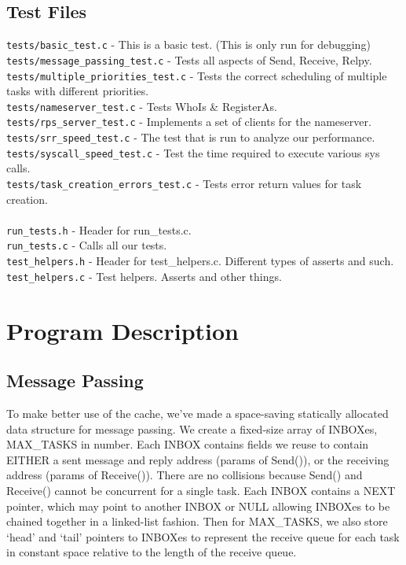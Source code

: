\documentclass[letterpaper]{article}
\begin{document}
\subsection{Test Files}
\verb!tests/basic_test.c! - This is a basic test. (This is only run for debugging)\\
\verb!tests/message_passing_test.c! - Tests all aspects of Send, Receive, Relpy.\\
\verb!tests/multiple_priorities_test.c! - Tests the correct scheduling of multiple tasks with different priorities.\\
\verb!tests/nameserver_test.c! - Tests WhoIs \& RegisterAs.\\
\verb!tests/rps_server_test.c! - Implements a set of clients for the nameserver.\\
\verb!tests/srr_speed_test.c! - The test that is run to analyze our performance.\\
\verb!tests/syscall_speed_test.c! - Test the time required to execute various sys calls.\\
\verb!tests/task_creation_errors_test.c! - Tests error return values for task creation.\\
\\
\verb!run_tests.h! - Header for run\_tests.c.\\
\verb!run_tests.c! - Calls all our tests.\\
\verb!test_helpers.h! - Header for test\_helpers.c. Different types of asserts and such.\\
\verb!test_helpers.c! - Test helpers. Asserts and other things.

\section{Program Description}

\subsection{Message Passing}

To make better use of the cache, we've made a space-saving statically allocated data structure for message passing. We create a fixed-size array of INBOXes, MAX\_TASKS in number. Each INBOX contains fields we reuse to contain EITHER a sent message and reply address (params of Send()), or the receiving address (params of Receive()). There are no collisions because Send() and Receive() cannot be concurrent for a single task. Each INBOX contains a NEXT pointer, which may point to another INBOX or NULL allowing INBOXes to be chained together in a linked-list fashion. Then for MAX\_TASKS, we also store `head' and `tail' pointers to INBOXes to represent the receive queue for each task in constant space relative to the length of the receive queue.
\end{document}

